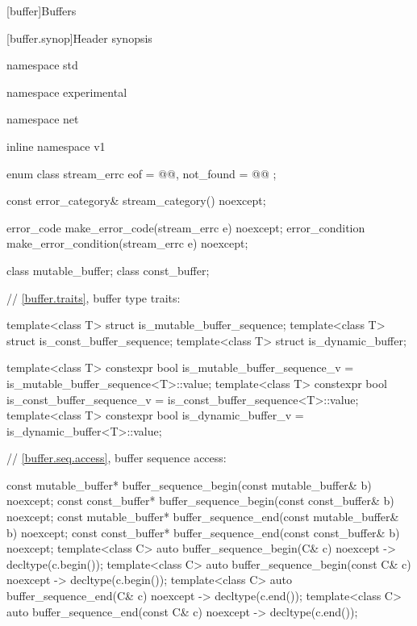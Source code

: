 
[buffer]{Buffers}


%
[buffer.synop]{Header  synopsis}

%
%
%
%
\begin{codeblock}
namespace std {
namespace experimental {
namespace net {
inline namespace v1 {

  enum class stream_errc {
    eof = @@,
    not_found = @@
  };

  const error_category& stream_category() noexcept;

  error_code make_error_code(stream_errc e) noexcept;
  error_condition make_error_condition(stream_errc e) noexcept;

  class mutable_buffer;
  class const_buffer;

  // \ref{buffer.traits}, buffer type traits:

  template<class T> struct is_mutable_buffer_sequence;
  template<class T> struct is_const_buffer_sequence;
  template<class T> struct is_dynamic_buffer;

  template<class T>
    constexpr bool is_mutable_buffer_sequence_v = is_mutable_buffer_sequence<T>::value;
  template<class T>
    constexpr bool is_const_buffer_sequence_v = is_const_buffer_sequence<T>::value;
  template<class T>
    constexpr bool is_dynamic_buffer_v = is_dynamic_buffer<T>::value;

  // \ref{buffer.seq.access}, buffer sequence access:

  const mutable_buffer* buffer_sequence_begin(const mutable_buffer& b) noexcept;
  const const_buffer* buffer_sequence_begin(const const_buffer& b) noexcept;
  const mutable_buffer* buffer_sequence_end(const mutable_buffer& b) noexcept;
  const const_buffer* buffer_sequence_end(const const_buffer& b) noexcept;
  template<class C> auto buffer_sequence_begin(C& c) noexcept -> decltype(c.begin());
  template<class C> auto buffer_sequence_begin(const C& c) noexcept -> decltype(c.begin());
  template<class C> auto buffer_sequence_end(C& c) noexcept -> decltype(c.end());
  template<class C> auto buffer_sequence_end(const C& c) noexcept -> decltype(c.end());

}}}}
\end{codeblock}
